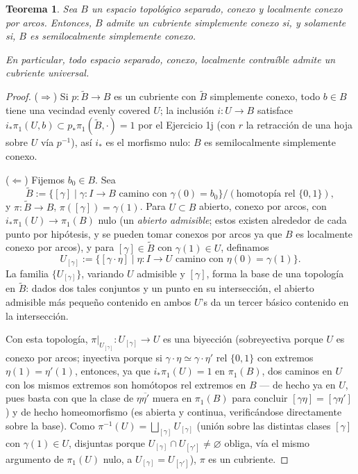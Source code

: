 \documentclass[11pt,a4paper]{article}
\theoremstyle{plain}
\newtheorem{theorem}{Teorema}[section]
\theoremstyle{definition}
\theoremstyle{remark}
\begin{document}
\begin{theorem}
\label{thm:existencia-cubriente-universal}
Sea $B$ un espacio topológico separado, conexo y localmente conexo por
arcos. Entonces, $B$ admite un cubriente simplemente conexo si, y
solamente si, $B$ es semilocalmente simplemente conexo.

En particular, todo espacio separado, conexo, localmente contraíble admite
un cubriente universal.
\end{theorem}

\begin{proof}
($\Rightarrow$) Si $p:\tilde B\to B$ es un cubriente con $\tilde B$
simplemente conexo, todo $b\in B$ tiene una vecindad evenly covered $U$;
la inclusión $i:U\to B$ satisface $i_*\pi_1(U,b)\subset p_*\pi_1(\tilde B,\cdot)=1$
por el Ejercicio 1j (con $r$ la retracción de una hoja sobre $U$ vía
$p^{-1}$), así $i_*$ es el morfismo nulo: $B$ es semilocalmente
simplemente conexo.

($\Leftarrow$) Fijemos $b_0\in B$. Sea
\[
\tilde B:=\{[\gamma]\mid\gamma:I\to B\text{ camino con }\gamma(0)=b_0\}\big/(\text{homotopía rel }\{0,1\}),
\]
y $\pi:\tilde B\to B$, $\pi([\gamma])=\gamma(1)$. Para $U\subset B$
abierto, conexo por arcos, con $i_*\pi_1(U)\to\pi_1(B)$ nulo (un
\emph{abierto admisible}; estos existen alrededor de cada punto por
hipótesis, y se pueden tomar conexos por arcos ya que $B$ es localmente
conexo por arcos), y para $[\gamma]\in\tilde B$ con $\gamma(1)\in U$,
definamos
\[
U_{[\gamma]}:=\{[\gamma\cdot\eta]\mid\eta:I\to U\text{ camino con }\eta(0)=\gamma(1)\}.
\]
La familia $\{U_{[\gamma]}\}$, variando $U$ admisible y $[\gamma]$, forma
la base de una topología en $\tilde B$: dados dos tales conjuntos y un
punto en su intersección, el abierto admisible más pequeño contenido en
ambos $U$'s da un tercer básico contenido en la intersección.

Con esta topología, $\pi|_{U_{[\gamma]}}:U_{[\gamma]}\to U$ es una
biyección (sobreyectiva porque $U$ es conexo por arcos; inyectiva porque
si $\gamma\cdot\eta\simeq\gamma\cdot\eta'$ rel $\{0,1\}$ con extremos
$\eta(1)=\eta'(1)$, entonces, ya que $i_*\pi_1(U)=1$ en $\pi_1(B)$, dos
caminos en $U$ con los mismos extremos son homótopos rel extremos en $B$
--- de hecho ya en $U$, pues basta con que la clase de
$\eta\overline{\eta'}$ muera en $\pi_1(B)$ para concluir
$[\gamma\eta]=[\gamma\eta']$) y de hecho homeomorfismo (es abierta y
continua, verificándose directamente sobre la base). Como
$\pi^{-1}(U)=\bigsqcup_{[\gamma]}U_{[\gamma]}$ (unión sobre las distintas
clases $[\gamma]$ con $\gamma(1)\in U$, disjuntas porque
$U_{[\gamma]}\cap U_{[\gamma']}\ne\varnothing$ obliga, vía el mismo
argumento de $\pi_1(U)$ nulo, a $U_{[\gamma]}=U_{[\gamma']}$), $\pi$ es un
cubriente.


\end{proof}
\end{document}
